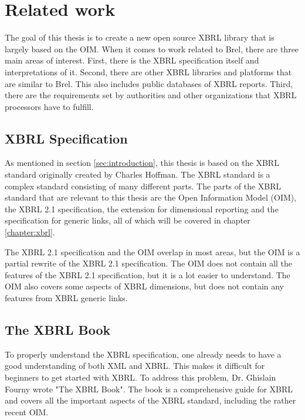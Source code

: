 \chapter{Related work}
\label{sec:related_work}

The goal of this thesis is to create a new open source XBRL library that is largely based on the OIM.
When it comes to work related to Brel, there are three main areas of interest.
First, there is the XBRL specification itself and interpretations of it.
Second, there are other XBRL libraries and platforms that are similar to Brel. This also includes public databases of XBRL reports.
Third, there are the requirements set by authorities and other organizations that XBRL processors have to fulfill.

\section{XBRL Specification}
As mentioned in section \ref{sec:introduction}, this thesis is based on the XBRL standard\cite{xbrl} originally created by Charles Hoffman.
The XBRL standard is a complex standard consisting of many different parts.
The parts of the XBRL standard that are relevant to this thesis are the Open Information Model (OIM)\cite{oim}, 
the XBRL 2.1 specification\cite{xbrl21}, 
the extension for dimensional reporting\cite{xbrl_dimensions}
and the specification for generic links\cite{xbrl_generic_links}, 
all of which will be covered in chapter \ref{chapter:xbrl}.

The XBRL 2.1 specification and the OIM overlap in most areas, but the OIM is a partial rewrite of the XBRL 2.1 specification.
The OIM does not contain all the features of the XBRL 2.1 specification, but it is a lot easier to understand.
The OIM also covers some aspects of XBRL dimensions, but does not contain any features from XBRL generic links.

\section{The XBRL Book}
To properly understand the XBRL specification, one already needs to have a good understanding of both XML and XBRL.
This makes it difficult for beginners to get started with XBRL.
To address this problem, Dr. Ghislain Fourny wrote "The XBRL Book"\cite{fourny2023xbrl}.
The book is a comprehensive guide for XBRL and covers all the important aspects of the XBRL standard, including the rather recent OIM.

